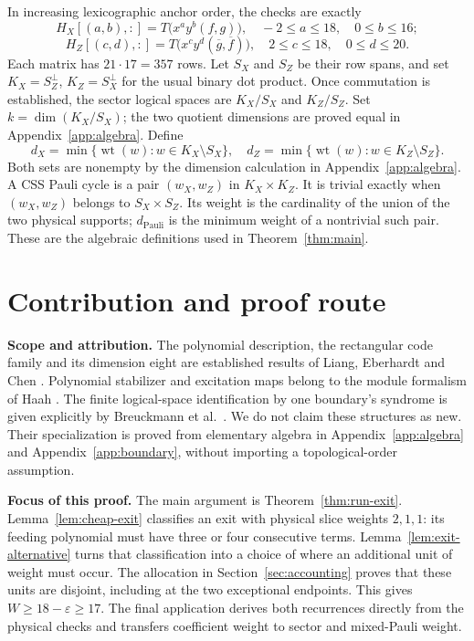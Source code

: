 \documentclass{article}
\DeclareMathOperator{\wt}{wt}
\begin{document}
In increasing lexicographic anchor order, the checks are exactly
\begin{equation}
  H_X[(a,b), {:}] = T\bigl(x^a y^b (f, g)\bigr),
  \quad -2 \le a \le 18, \quad 0 \le b \le 16;
\end{equation}
\begin{equation}
  H_Z[(c,d), {:}] = T\bigl(x^c y^d (\overline{g}, \overline{f})\bigr),
  \quad 2 \le c \le 18, \quad 0 \le d \le 20.
\end{equation}
Each matrix has \(21 \cdot 17 = 357\) rows.
Let \(S_X\) and \(S_Z\) be their row spans, and set
\(K_X = S_Z^{\perp}\), \(K_Z = S_X^{\perp}\) for the usual binary dot product.
Once commutation is established, the sector logical spaces are
\(K_X/S_X\) and \(K_Z/S_Z\). Set \(k = \dim(K_X/S_X)\); the two quotient
dimensions are proved equal in Appendix~\ref{app:algebra}. Define
\begin{equation}
  d_X = \min\{\wt(w) : w \in K_X \setminus S_X\}, \quad
  d_Z = \min\{\wt(w) : w \in K_Z \setminus S_Z\}.
\end{equation}
Both sets are nonempty by the dimension calculation in Appendix~\ref{app:algebra}.
A CSS Pauli cycle is a pair \((w_X, w_Z)\) in \(K_X \times K_Z\).
It is trivial exactly when \((w_X, w_Z)\) belongs to \(S_X \times S_Z\).
Its weight is the cardinality of the union of the two physical supports;
\(d_{\mathrm{Pauli}}\) is the minimum weight of a nontrivial such pair. These are
the algebraic definitions used in Theorem~\ref{thm:main}.

\section{Contribution and proof route}\label{sec:contribution}

\textbf{Scope and attribution.} The polynomial description, the rectangular code
family and its dimension eight are established results of Liang, Eberhardt
and Chen \cite[Section~II and Figure~1]{liang2025}. Polynomial stabilizer and
excitation maps belong to the module formalism of Haah
\cite[Sections~1--3]{haah2013}. The finite logical-space identification by one
boundary's syndrome is given explicitly by Breuckmann et al.\
\cite[Section~4.3, Lemmas~4--5 and Theorem~3]{tile2025}. We do not claim these
structures as new. Their specialization is proved from elementary algebra
in Appendix~\ref{app:algebra} and Appendix~\ref{app:boundary}, without importing a
topological-order assumption.

\textbf{Focus of this proof.} The main argument is Theorem~\ref{thm:run-exit}.
Lemma~\ref{lem:cheap-exit} classifies an exit with physical slice weights \(2, 1, 1\): its
feeding polynomial must have three or four consecutive terms. Lemma~\ref{lem:exit-alternative}
turns that classification into a choice of where an additional unit of weight must occur. The
allocation in Section~\ref{sec:accounting} proves that these units
are disjoint, including at the two exceptional endpoints. This gives
\(W \ge 18 - \varepsilon \ge 17\). The final application derives both recurrences
directly from the physical checks and transfers coefficient weight to
sector and mixed-Pauli weight.
\end{document}
